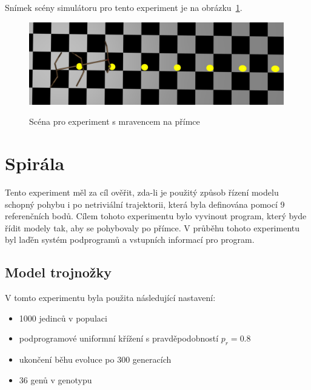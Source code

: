 Snímek scény simulátoru pro tento experiment je na obrázku~\ref{fig:mravenec_primka_zhora}.
\begin{figure}[h]
    \centering
    {\includegraphics[width=30em]{obrazky/mravenec_primka_zhora.png}}
    \caption{
    Scéna pro experiment s mravencem na přímce
    }
    \label{fig:mravenec_primka_zhora}
\end{figure}





\section{Spirála}
Tento experiment měl za cíl ověřit, zda-li je použitý způsob řízení modelu schopný pohybu i po netriviální trajektorii, která byla definována pomocí 9 referenčních bodů.
Cílem tohoto experimentu bylo vyvinout program, který byde řídit modely tak, aby se pohybovaly po přímce.
V průběhu tohoto experimentu byl laďěn systém podprogramů a vstupních informací pro program.

\subsection{Model trojnožky}
V tomto experimentu byla použita následující nastavení:
\begin{itemize}
    \item 1000 jedinců v populaci
    \item podprogramové uniformní křížení s pravděpodobností $p_r = 0.8$
    \item ukončení běhu evoluce po 300 generacích
    \item 36 genů v genotypu
\end{itemize}


